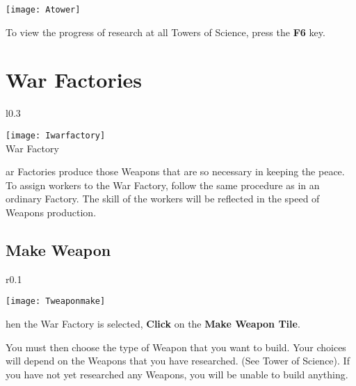 \begin{center}
    \texttt{[image: Atower]} %
\end{center}

To view the progress of research at all Towers of Science, press the \textbf{F6} key.

\section{\textsf{War Factories}}


\begin{wrapfigure}{l}{0.3\textwidth}
    \vspace{-20pt}
    \begin{center}
        \texttt{[image: Iwarfactory]} %
        \\ War Factory
    \end{center}
    \vspace{-30pt}
\end{wrapfigure}

ar Factories produce those Weapons that are so necessary in keeping the peace. To assign workers to the War Factory, follow the same procedure as in an ordinary Factory. The skill of the workers will be reflected in the speed of Weapons production.

\subsection{\textsf{Make Weapon}}


\begin{wrapfigure}{r}{0.1\textwidth}
    \vspace{-20pt}
    \begin{center}
        \texttt{[image: Tweaponmake]}
    \end{center}
    \vspace{-20pt}
\end{wrapfigure}

hen the War Factory is selected, \textbf{Click} on the \textbf{Make Weapon Tile}.

You must then choose the type of Weapon that you want to build. Your choices will depend on the Weapons that you have researched. (See Tower of Science). If you have not yet researched any Weapons, you will be unable to build anything.

